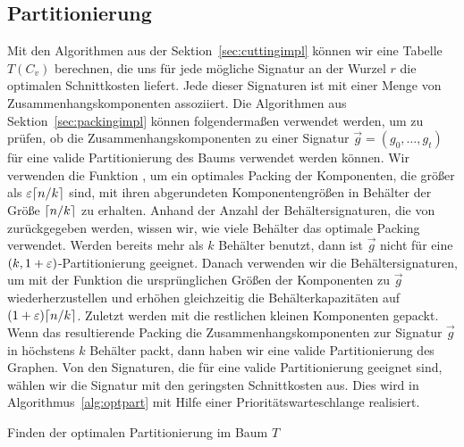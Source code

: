 \subsection{Partitionierung}
Mit den Algorithmen aus der Sektion~\ref{sec:cuttingimpl} können wir eine Tabelle $T(C_v)$ berechnen, die uns für jede mögliche Signatur an der Wurzel $r$ die optimalen Schnittkosten liefert.
Jede dieser Signaturen ist mit einer Menge von Zusammenhangskomponenten assoziiert.
Die Algorithmen aus Sektion~\ref{sec:packingimpl} können folgendermaßen verwendet werden, um zu prüfen, ob die Zusammenhangskomponenten zu einer Signatur $\vec{g} = (g_0, \ldots, g_t)$ für eine valide Partitionierung des Baums verwendet werden können.
Wir verwenden die Funktion , um ein optimales Packing der Komponenten, die größer als $\varepsilon \lceil n/k\rceil$ sind, mit ihren abgerundeten Komponentengrößen in Behälter der Größe $\lceil n/k\rceil$ zu erhalten.
Anhand der Anzahl der Behältersignaturen, die von  zurückgegeben werden, wissen wir, wie viele Behälter das optimale Packing verwendet.
Werden bereits mehr als $k$ Behälter benutzt, dann ist $\vec{g}$ nicht für eine $(k, 1+\varepsilon)$\hyp Partitionierung geeignet.
Danach verwenden wir die Behältersignaturen, um mit der Funktion  die ursprünglichen Größen der Komponenten zu $\vec{g}$ wiederherzustellen und erhöhen gleichzeitig die Behälterkapazitäten auf $(1+\varepsilon) \lceil n/k\rceil$.
Zuletzt werden mit  die restlichen kleinen Komponenten gepackt.
Wenn das resultierende Packing die Zusammenhangskomponenten zur Signatur $\vec{g}$ in höchstens $k$ Behälter packt, dann haben wir eine valide Partitionierung des Graphen.
Von den Signaturen, die für eine valide Partitionierung geeignet sind, wählen wir die Signatur mit den geringsten Schnittkosten aus.
Dies wird in Algorithmus~\ref{alg:optpart} mit Hilfe einer Prioritätswarteschlange realisiert.

\begin{algorithm}
    \caption{Finden der optimalen Partitionierung im Baum $T$}
    \label{alg:optpart}
    \begin{algorithmic}[1]
         
             
        \EndFor
                    \State{\Break} 
                \EndIf
            \EndIf
        \EndWhile
    \end{algorithmic}
\end{algorithm}


